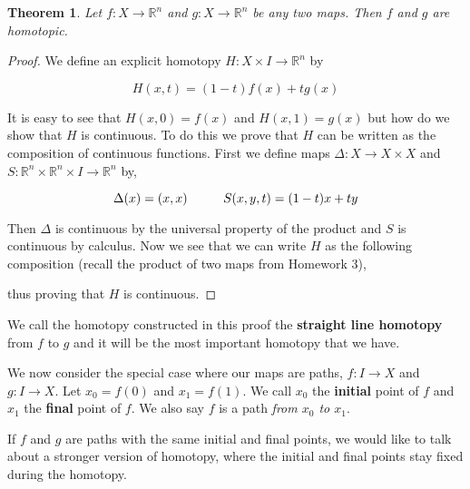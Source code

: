 \documentclass[a4paper]{article}
\newtheorem{theorem}{Theorem}
\numberwithin{theorem}{section}
\begin{document}
\begin{theorem}
Let $f:X \rightarrow \mathbb{R}^n$ and $g: X \rightarrow \mathbb{R}^n$ be any two maps. Then $f$ and $g$ are homotopic.
\end{theorem}

\begin{proof}
We define an explicit homotopy $H: X \times I \rightarrow \mathbb{R}^n$ by

$$ H(x,t) = (1-t)f(x) + tg(x) $$

It is easy to see that $H(x,0) = f(x)$ and $H(x,1) = g(x)$ but how do we show that $H$ is continuous. To do this we prove that $H$ can be written as the composition of continuous functions. First we define maps $\Delta: X \rightarrow X \times X$ and $S: \mathbb{R}^n \times \mathbb{R}^n \times I \rightarrow \mathbb{R}^n$ by,

$$ \Delta(x) = (x,x) \text{\hspace{1cm}}  S(x,y,t) = (1-t)x + ty $$

Then $\Delta$ is continuous by the universal property of the product and $S$ is continuous by calculus. Now we see that we can write $H$ as the following composition (recall the product of two maps from Homework 3),

\begin{center}


\end{center}

thus proving that $H$ is continuous. 

\end{proof}

We call the homotopy constructed in this proof the \textbf{straight line homotopy} from $f$ to $g$ and it will be the most important homotopy that we have.

We now consider the special case where our maps are paths, $f: I \rightarrow X$ and $g: I \rightarrow X$. Let $x_0 = f(0)$ and $x_1 = f(1)$. We call $x_0$ the \textbf{initial} point of $f$ and $x_1$ the \textbf{final} point of $f$. We also say $f$ is a path \textit{from $x_0$ to $x_1$}.

If $f$ and $g$ are paths with the same initial and final points, we would like to talk about a stronger version of homotopy, where the initial and final points stay fixed during the homotopy.
\end{document}
